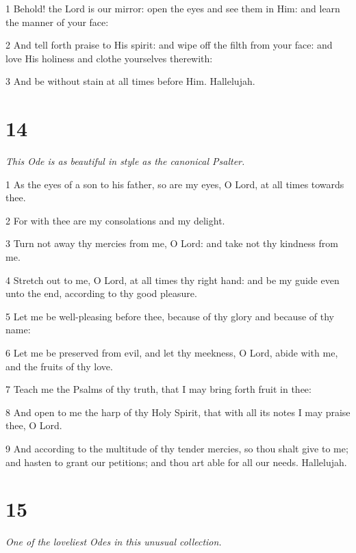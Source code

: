 \par 1 Behold! the Lord is our mirror: open the eyes and see them in Him: and learn the manner of your face:
\par 2 And tell forth praise to His spirit: and wipe off the filth from your face: and love His holiness and clothe yourselves therewith:
\par 3 And be without stain at all times before Him. Hallelujah.

\chapter{14}

\par \textit{This Ode is as beautiful in style as the canonical Psalter.}

\par 1 As the eyes of a son to his father, so are my eyes, O Lord, at all times towards thee.
\par 2 For with thee are my consolations and my delight.
\par 3 Turn not away thy mercies from me, O Lord: and take not thy kindness from me.
\par 4 Stretch out to me, O Lord, at all times thy right hand: and be my guide even unto the end, according to thy good pleasure.
\par 5 Let me be well-pleasing before thee, because of thy glory and because of thy name:
\par 6 Let me be preserved from evil, and let thy meekness, O Lord, abide with me, and the fruits of thy love.
\par 7 Teach me the Psalms of thy truth, that I may bring forth fruit in thee:
\par 8 And open to me the harp of thy Holy Spirit, that with all its notes I may praise thee, O Lord.
\par 9 And according to the multitude of thy tender mercies, so thou shalt give to me; and hasten to grant our petitions; and thou art able for all our needs. Hallelujah.



\chapter{15}

\par \textit{One of the loveliest Odes in this unusual collection.}

